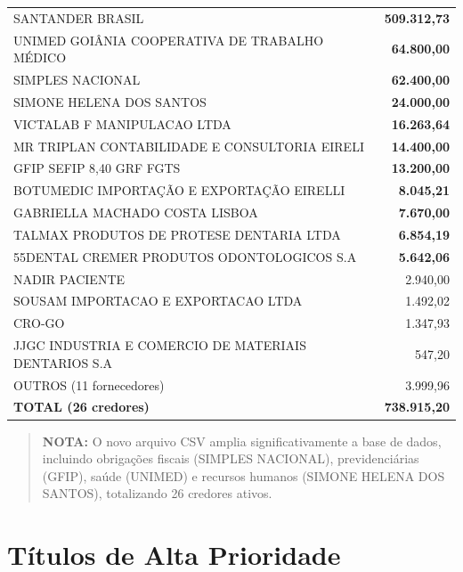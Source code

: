 \documentclass[12pt, a4paper]{article}
\begin{document}
\begin{longtable}{>{\raggedright\arraybackslash}p{9cm} r}
    SANTANDER BRASIL & \textcolor{accentColor}{\textbf{509.312,73}} \\
    UNIMED GOIÂNIA COOPERATIVA DE TRABALHO MÉDICO & \textcolor{accentColor}{\textbf{64.800,00}} \\
    SIMPLES NACIONAL & \textcolor{accentColor}{\textbf{62.400,00}} \\
    SIMONE HELENA DOS SANTOS & \textcolor{accentColor}{\textbf{24.000,00}} \\
    VICTALAB F MANIPULACAO LTDA & \textcolor{accentColor}{\textbf{16.263,64}} \\
    MR TRIPLAN CONTABILIDADE E CONSULTORIA EIRELI & \textcolor{accentColor}{\textbf{14.400,00}} \\
    GFIP SEFIP 8,40 GRF FGTS & \textcolor{accentColor}{\textbf{13.200,00}} \\
    BOTUMEDIC IMPORTAÇÃO E EXPORTAÇÃO EIRELLI & \textcolor{accentColor}{\textbf{8.045,21}} \\
    GABRIELLA MACHADO COSTA LISBOA & \textcolor{accentColor}{\textbf{7.670,00}} \\
    TALMAX PRODUTOS DE PROTESE DENTARIA LTDA & \textcolor{accentColor}{\textbf{6.854,19}} \\
    55DENTAL CREMER PRODUTOS ODONTOLOGICOS S.A & \textcolor{accentColor}{\textbf{5.642,06}} \\
    NADIR PACIENTE & 2.940,00 \\
    SOUSAM IMPORTACAO E EXPORTACAO LTDA & 1.492,02 \\
    CRO-GO & 1.347,93 \\
    JJGC INDUSTRIA E COMERCIO DE MATERIAIS DENTARIOS S.A & 547,20 \\
    OUTROS (11 fornecedores) & 3.999,96 \\
    \midrule
    \rowcolor{lightGray} \textbf{TOTAL (26 credores)} & \textbf{738.915,20} \\
\end{longtable}

\vspace{-0.3cm}
\begin{quote}
    \footnotesize \textbf{NOTA:} O novo arquivo CSV amplia significativamente a base de dados, incluindo obrigações fiscais (SIMPLES NACIONAL), previdenciárias (GFIP), saúde (UNIMED) e recursos humanos (SIMONE HELENA DOS SANTOS), totalizando 26 credores ativos.
\end{quote}

\newpage

\section{Títulos de Alta Prioridade}
\end{document}
